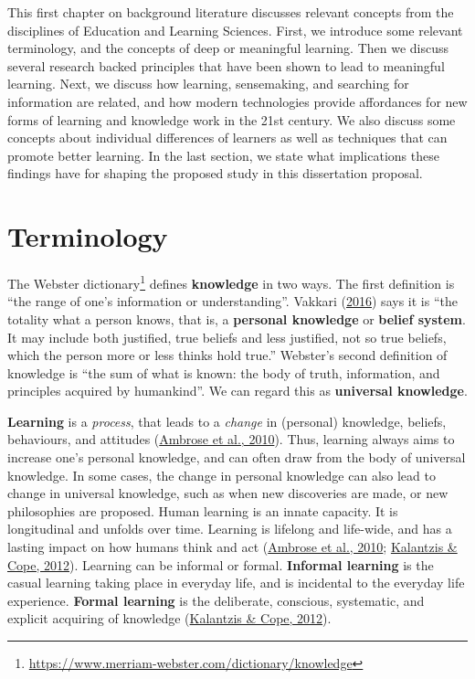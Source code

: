 \documentclass[letterpaper, nobind]{templates/ociamthesis}
\begin{document}
This first chapter on background literature discusses relevant concepts
from the disciplines of Education and Learning Sciences. First, we
introduce some relevant terminology, and the concepts of deep or
meaningful learning. Then we discuss several research backed principles
that have been shown to lead to meaningful learning. Next, we discuss
how learning, sensemaking, and searching for information are related,
and how modern technologies provide affordances for new forms of
learning and knowledge work in the 21st century. We also discuss some
concepts about individual differences of learners as well as techniques
that can promote better learning. In the last section, we state what
implications these findings have for shaping the proposed study in this
dissertation proposal.

\hypertarget{sec-bg-learn-terminology}{%
\section{Terminology}\label{sec-bg-learn-terminology}}

The Webster dictionary\footnote{\url{https://www.merriam-webster.com/dictionary/knowledge}} defines \textbf{knowledge} in two ways. The first
definition is ``the range of one's information or understanding''.
Vakkari (\protect\hyperlink{ref-vakkari2016searching}{2016}) says it is ``the totality what a person knows,
that is, a \textbf{personal knowledge} or \textbf{belief system}. It may include
both justified, true beliefs and less justified, not so true beliefs,
which the person more or less thinks hold true.'' Webster's second
definition of knowledge is ``the sum of what is known: the body of truth,
information, and principles acquired by humankind''. We can regard this
as \textbf{universal knowledge}.

\textbf{Learning} is a \emph{process}, that leads to a \emph{change} in (personal)
knowledge, beliefs, behaviours, and attitudes (\protect\hyperlink{ref-ambrose2010howa}{Ambrose et al., 2010}). Thus,
learning always aims to increase one's personal knowledge, and can often
draw from the body of universal knowledge. In some cases, the change in
personal knowledge can also lead to change in universal knowledge, such
as when new discoveries are made, or new philosophies are proposed.
Human learning is an innate capacity. It is longitudinal and unfolds
over time. Learning is lifelong and life-wide, and has a lasting impact
on how humans think and act (\protect\hyperlink{ref-ambrose2010howa}{Ambrose et al., 2010}; \protect\hyperlink{ref-kalantzis2012newa}{Kalantzis \& Cope, 2012}).
Learning can be informal or formal. \textbf{Informal learning} is the casual
learning taking place in everyday life, and is incidental to the
everyday life experience. \textbf{Formal learning} is the deliberate,
conscious, systematic, and explicit acquiring of knowledge
(\protect\hyperlink{ref-kalantzis2012newa}{Kalantzis \& Cope, 2012}).
\end{document}
